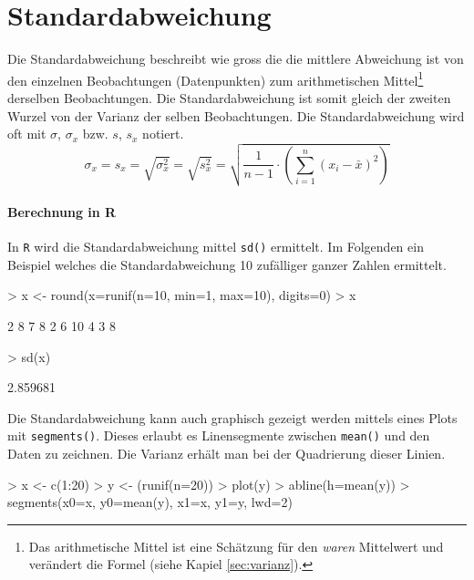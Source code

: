 \section{Standardabweichung}
Die \gls{Standardabweichung} beschreibt wie gross die die mittlere 
Abweichung ist von den einzelnen Beobachtungen (Datenpunkten) zum 
arithmetischen Mittel\footnote{Das arithmetische Mittel ist eine 
Schätzung für den
\emph{waren} Mittelwert und verändert die Formel 
(siehe Kapiel \ref{sec:varianz}).} 
derselben Beobachtungen. Die Standardabweichung ist somit gleich
der zweiten Wurzel von der Varianz der selben Beobachtungen. Die
Standardabweichung wird oft mit $\sigma$, $\sigma_x$ bzw. $s$, $s_x$ 
notiert.
\[
	\sigma_x 
	= s_x 
	= \sqrt{\sigma_{x}^2}
	= \sqrt{s_{x}^2}
	= \sqrt{\frac{1}{n-1} \cdot \left(
		\sum_{i=1}^n (x_i-\bar{x})^2 
	\right)}
\]

\paragraph{Berechnung in R}
In \lstinline{R} wird die Standardabweichung mittel \lstinline{sd()}
ermittelt. Im Folgenden ein Beispiel welches die Standardabweichung
10 zufälliger ganzer Zahlen ermittelt.
\begin{Schunk}
\begin{Sinput}
> x <- round(x=runif(n=10, min=1, max=10), digits=0)
> x
\end{Sinput}
\begin{Soutput}
 [1]  2  8  7  8  2  6 10  4  3  8
\end{Soutput}
\begin{Sinput}
> sd(x)
\end{Sinput}
\begin{Soutput}
[1] 2.859681
\end{Soutput}
\end{Schunk}
Die Standardabweichung kann auch graphisch gezeigt werden mittels
eines Plots mit \lstinline{segments()}. Dieses erlaubt es Linensegmente
zwischen \lstinline{mean()} und den Daten zu zeichnen. Die Varianz
erhält man bei der Quadrierung dieser Linien.
\begin{Schunk}
\begin{Sinput}
> x <- c(1:20)
> y <- (runif(n=20))
> plot(y)
> abline(h=mean(y))
> segments(x0=x, y0=mean(y), x1=x, y1=y, lwd=2)
\end{Sinput}
\end{Schunk}


